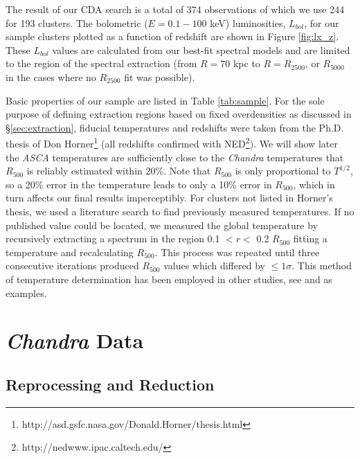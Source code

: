 \documentclass{emulateapj}
\begin{document}
The result of our CDA search is a total of 374 observations of which
we use 244 for 193 clusters. The bolometric ($E = 0.1-100$ keV)
luminosities, $L_{bol}$, for our sample clusters plotted as a function of
redshift are shown in Figure \ref{fig:lx_z}. These $L_{bol}$ values
are calculated from our best-fit spectral models and are limited to
the region of the spectral extraction (from $R=70$ kpc to
$R=R_{2500}$, or $R_{5000}$ in the cases where no $R_{2500}$ fit was
possible).

Basic properties of our sample are listed in Table
\ref{tab:sample}. For the sole purpose of defining extraction regions
based on fixed overdensities as discussed in \S\ref{sec:extraction},
fiducial temperatures and redshifts were taken from the Ph.D. thesis
of Don
Horner\footnote{http://asd.gsfc.nasa.gov/Donald.Horner/thesis.html}
(all redshifts confirmed with NED\footnote{http://nedwww.ipac.caltech.edu/}).
We will show later the {\it ASCA} temperatures are
sufficiently close to the {\it Chandra} temperatures that $R_{500}$
is reliably estimated within 20\%. Note that $R_{500}$ is only
proportional to $T^{1/2}$, so a 20\% error in the temperature leads to
only a 10\% error in $R_{500}$, which in turn affects our final
results imperceptibly. For clusters not listed in Horner's thesis, we
used a literature search to find previously measured temperatures. If
no published value could be located, we measured the global temperature by
recursively extracting a spectrum in the region 0.1 $< r <$ 0.2
$R_{500}$ fitting a temperature and recalculating $R_{500}$. This
process was repeated until three consecutive iterations produced
$R_{500}$ values which differed by $\leq 1\sigma$. This method of
temperature determination has been employed in other studies, see
\cite{2006MNRAS.tmp.1068S} and \cite{2006ApJS..162..304H} as
examples.

\section{{\it Chandra} Data}\label{sec:data}

\subsection{Reprocessing and Reduction}\label{sec:reprocessing}
\end{document}
